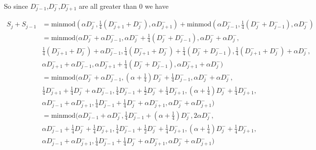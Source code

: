 \documentclass[10pt]{article}
\begin{document}
So since $D^-_{j-1}$,$D^-_{j}$,$D^-_{j+1}$ are all greater than $0$ we have

\begin{align}
S_j + S_{j-1} & = \text{minmod}\left(\alpha D^-_j, \frac{1}{4}\left(D^-_{j+1} +D^-_{j}\right),\alpha D^-_{j+1}\right) + \text{minmod}\left(\alpha D^-_{j-1}, \frac{1}{4}\left(D^-_{j} +D^-_{j-1}\right),\alpha D^-_{j}\right)\\
& = \text{minmod}\bigg(\alpha D^-_j +\alpha D^-_{j-1}, \alpha D^-_j + \frac{1}{4}\left(D^-_{j} +D^-_{j-1}\right)  , \alpha D^-_j + \alpha D^-_{j} , \\
& \frac{1}{4}\left(D^-_{j+1} +D^-_{j}\right) +\alpha D^-_{j-1}, \frac{1}{4}\left(D^-_{j+1} +D^-_{j}\right) + \frac{1}{4}\left(D^-_{j} +D^-_{j-1}\right)  , \frac{1}{4}\left(D^-_{j+1} +D^-_{j}\right) + \alpha D^-_{j}, \\
& \alpha D^-_{j+1} +\alpha D^-_{j-1}, \alpha D^-_{j+1} + \frac{1}{4}\left(D^-_{j} +D^-_{j-1}\right)  , \alpha D^-_{j+1} + \alpha D^-_{j} \bigg)\\
& = \text{minmod}\bigg(\alpha D^-_j +\alpha D^-_{j-1}, \left(\alpha + \frac{1}{4} \right) D^-_j + \frac{1}{4}D^-_{j-1}  , \alpha D^-_j + \alpha D^-_{j} , \\
& \frac{1}{4}D^-_{j+1} + \frac{1}{4} D^-_{j} +\alpha D^-_{j-1}, \frac{1}{4}D^-_{j-1} + \frac{1}{2} D^-_{j} + \frac{1}{4}D^-_{j+1}   , \left(\alpha + \frac{1}{4} \right)D^-_{j} + \frac{1}{4}D^-_{j+1},  \\
& \alpha D^-_{j-1} + \alpha D^-_{j+1}, \frac{1}{4} D^-_{j-1} + \frac{1}{4}D^-_{j} +  \alpha D^-_{j+1},\alpha D^-_{j} +  \alpha D^-_{j+1} \bigg)\\
& = \text{minmod}\bigg(\alpha D^-_{j-1} + \alpha D^-_j , \frac{1}{4}D^-_{j-1} +  \left(\alpha + \frac{1}{4} \right) D^-_j  , 2 \alpha D^-_j , \\
& \alpha D^-_{j-1} + \frac{1}{4} D^-_{j} + \frac{1}{4}D^-_{j+1}, \frac{1}{4}D^-_{j-1} + \frac{1}{2} D^-_{j} + \frac{1}{4}D^-_{j+1}   , \left(\alpha + \frac{1}{4} \right)D^-_{j} + \frac{1}{4}D^-_{j+1},  \\
& \alpha D^-_{j-1} + \alpha D^-_{j+1}, \frac{1}{4} D^-_{j-1} + \frac{1}{4}D^-_{j} +  \alpha D^-_{j+1},\alpha D^-_{j} +  \alpha D^-_{j+1} \bigg)
\end{align}
\end{document}
